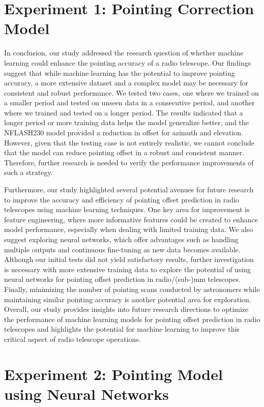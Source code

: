 \section{Experiment 1: Pointing Correction Model}
In conclusion, our study addressed the research question of whether machine learning could enhance the pointing accuracy of a radio telescope.
Our findings suggest that while machine learning has the potential to improve pointing accuracy, a more extensive dataset and a complex model may be necessary for consistent and robust performance.
We tested two cases, one where we trained on a smaller period and tested on unseen data in a consecutive period, and another where we trained and tested on a longer period.
The results indicated that a longer period or more training data helps the model generalize better, and the NFLASH230 model provided a reduction in offset for azimuth and elevation.
However, given that the testing case is not entirely realistic, we cannot conclude that the model can reduce pointing offset in a robust and consistent manner.
Therefore, further research is needed to verify the performance improvements of such a strategy.

Furthermore, our study highlighted several potential avenues for future research to improve the accuracy and efficiency of pointing offset prediction in radio telescopes using machine learning techniques.
One key area for improvement is feature engineering, where more informative features could be created to enhance model performance, especially when dealing with limited training data.
We also suggest exploring neural networks, which offer advantages such as handling multiple outputs and continuous fine-tuning as new data becomes available.
Although our initial tests did not yield satisfactory results, further investigation is necessary with more extensive training data to explore the potential of using neural networks for pointing offset prediction in radio/(sub-)mm telescopes.
Finally, minimizing the number of pointing scans conducted by astronomers while maintaining similar pointing accuracy is another potential area for exploration.
Overall, our study provides insights into future research directions to optimize the performance of machine learning models for pointing offset prediction in radio telescopes and highlights the potential for machine learning to improve this critical aspect of radio telescope operations.




\section{Experiment 2: Pointing Model using Neural Networks}

